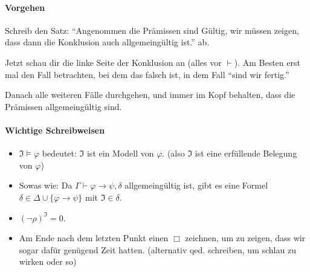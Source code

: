 \documentclass[
    ngerman,
    color=3b,
    summary,
    boxarc,
    main,
    fleqn,
    leqno,
]{rubos-tuda-template}
\begin{document}
    \paragraph{Vorgehen}
    \begin{steps}
        \item Schreib den Satz: \enquote{Angenommen die Prämissen sind Gültig, wir müssen zeigen, dass dann die Konklusion auch allgemeingültig ist.} ab.
        \item Jetzt schau dir die linke Seite der Konklusion an (alles vor $\vdash$). Am Besten erst mal den Fall betrachten, bei dem das falsch ist, in dem Fall \enquote{sind wir fertig.}
        \item Danach alle weiteren Fälle durchgehen, und immer im Kopf behalten, dass die Prämissen allgemeingültig sind.
    \end{steps}
    \paragraph{Wichtige Schreibweisen} \begin{itemize}
        \item $\mathfrak{I}\models\varphi$ bedeutet: $\mathfrak{I}$ ist ein Modell von $\varphi$. (also $\mathfrak{I}$ ist eine erfüllende Belegung von $\varphi$)
        \item Sowas wie: Da $\Gamma\vdash \varphi\rightarrow\psi ,\delta$ allgemeingültig ist, gibt es eine Formel $\delta\in\Delta\cup\{\varphi\rightarrow\psi\}$
            mit $\mathfrak{I}\in\delta$.
        \item $(\lnot \rho)^{\mathfrak{I}}=0$.
        \item Am Ende nach dem letzten Punkt einen $\Box$ zeichnen, um zu zeigen, dass wir sogar dafür genügend Zeit hatten. (alternativ qed. schreiben, um schlau zu wirken oder so)
    \end{itemize}
    \clearpage
\end{document}
